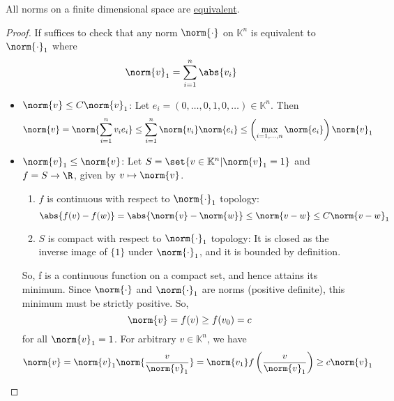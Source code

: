 \documentclass{article}
\newcommand{\K}{\mathbb{K}}
\begin{document}
\begin{prop}
    All norms on a finite dimensional space are \hyperlink{def:eqNorm}{equivalent}.
\end{prop}

\begin{proof}
    If suffices to check that any norm $\norm{\cdot}$ on $\K^n$ is equivalent to $\norm{\cdot}_1$ where
    \begin{equation}
        \norm{v}_1 = \sum_{i=1}^n \abs{v_i}
    \end{equation}

    \begin{itemize}
        \item $\norm{v} \leq C \norm{v}_1$: Let $e_i = (0, \dotsc, 0, 1, 0, \dotsc) \in \K^n$. Then
            \begin{equation*}
                \norm{v} = \norm{\sum_{i=1}^n v_i e_i} \leq \sum_{i=1}^n \norm{v_i} \norm{e_i} \leq \left(\max_{i=1,\dotsc,n} \norm{e_i}\right) \norm{v}_1
            \end{equation*}

        \item $\norm{v}_1 \leq \norm{v}$: Let $S = \set{v \in \K^n | \norm{v}_1 = 1}$ and $f = S \to \R$, given by $v \mapsto \norm{v}$.
            \begin{enumerate}
                \item $f$ is continuous with respect to $\norm{\cdot}_1$ topology:
                    \begin{equation*}
                        \abs{f(v) - f(w)} = \abs{\norm{v} - \norm{w}} \leq \norm{v - w} \leq C \norm{v-w}_1
                    \end{equation*}
                \item $S$ is compact with respect to $\norm{\cdot}_1$ topology:
                    It is closed as the inverse image of $\{1\}$ under $\norm{\cdot}_1$, and it is bounded by definition.
            \end{enumerate}
            So, f is a continuous function on a compact set, and hence attains its minimum.
            Since $\norm{\cdot}$ and $\norm{\cdot}_1$ are norms (positive definite), this minimum must be strictly positive.
            So, \begin{equation*}\norm{v} = f(v) \geq f(v_0) = c\end{equation*} for all $\norm{v}_1 = 1$.
            For arbitrary $v \in \K^n$, we have
            \begin{equation*}
                \norm{v} = \norm{v}_1 \norm{\frac{v}{\norm{v}_1}} = \norm{v_1} f\left(\frac{v}{\norm{v}_1}\right) \geq c \norm{v}_1
            \end{equation*}
    \end{itemize}
\end{proof}
\end{document}
